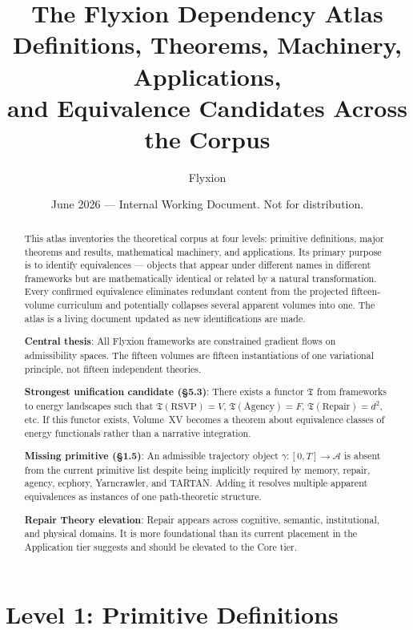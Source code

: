 \documentclass[11pt, a4paper]{article}
\title{%
  \textbf{The Flyxion Dependency Atlas}\\[0.4em]
  \large Definitions, Theorems, Machinery, Applications,\\
  and Equivalence Candidates Across the Corpus
}
\author{Flyxion}
\date{June 2026 --- Internal Working Document. Not for distribution.}
\begin{document}
\maketitle
\thispagestyle{empty}

\begin{abstract}
This atlas inventories the theoretical corpus at four levels: primitive
definitions, major theorems and results, mathematical machinery, and
applications. Its primary purpose is to identify equivalences ---
objects that appear under different names in different frameworks but
are mathematically identical or related by a natural transformation.
Every confirmed equivalence eliminates redundant content from the
projected fifteen-volume curriculum and potentially collapses several
apparent volumes into one. The atlas is a living document updated as
new identifications are made.

\medskip
\noindent\textbf{Central thesis}: All Flyxion frameworks are constrained
gradient flows on admissibility spaces. The fifteen volumes are fifteen
instantiations of one variational principle, not fifteen independent
theories.

\medskip
\noindent\textbf{Strongest unification candidate (§5.3)}: There exists
a functor $\mathfrak{T}$ from frameworks to energy landscapes such that
$\mathfrak{T}(\text{RSVP}) = V$, $\mathfrak{T}(\text{Agency}) = F$,
$\mathfrak{T}(\text{Repair}) = d^2$, etc. If this functor exists,
Volume~XV becomes a theorem about equivalence classes of energy
functionals rather than a narrative integration.

\medskip
\noindent\textbf{Missing primitive (§1.5)}: An admissible trajectory
object $\gamma: [0,T] \to \mathcal{A}$ is absent from the current
primitive list despite being implicitly required by memory, repair,
agency, ecphory, Yarncrawler, and TARTAN. Adding it resolves multiple
apparent equivalences as instances of one path-theoretic structure.

\medskip
\noindent\textbf{Repair Theory elevation}: Repair appears across
cognitive, semantic, institutional, and physical domains. It is more
foundational than its current placement in the Application tier
suggests and should be elevated to the Core tier.
\end{abstract}

\newpage
\tableofcontents
\newpage

\section{Level 1: Primitive Definitions}
\end{document}
